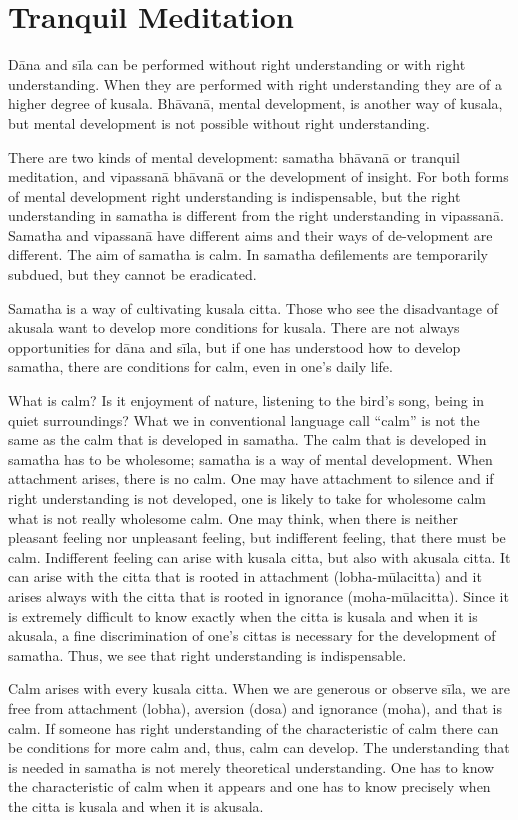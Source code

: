 \section*{Tranquil Meditation}

Dāna and sīla can be performed without right understanding or with right
understanding. When they are performed with right understanding they are
of a higher degree of kusala. Bhāvanā, mental development, is another
way of kusala, but mental development is not possible without right
understanding.

There are two kinds of mental development: samatha bhāvanā or tranquil
meditation, and vipassanā bhāvanā or the development of insight. For
both forms of mental development right understanding is indispensable,
but the right understanding in samatha is different from the right
understanding in vipassanā. Samatha and vipassanā have different aims
and their ways of de-velopment are different. The aim of samatha is
calm. In samatha defilements are temporarily subdued, but they cannot be
eradicated.

Samatha is a way of cultivating kusala citta. Those who see the
disadvantage of akusala want to develop more conditions for kusala.
There are not always opportunities for dāna and sīla, but if one has
understood how to develop samatha, there are conditions for calm, even
in one's daily life.

What is calm? Is it enjoyment of nature, listening to the bird's song,
being in quiet surroundings? What we in conventional language call
``calm'' is not the same as the calm that is developed in samatha. The
calm that is developed in samatha has to be wholesome; samatha is a way
of mental development. When attachment arises, there is no calm. One may
have attachment to silence and if right understanding is not developed,
one is likely to take for wholesome calm what is not really wholesome
calm. One may think, when there is neither pleasant feeling nor
unpleasant feeling, but indifferent feeling, that there must be calm.
Indifferent feeling can arise with kusala citta, but also with akusala
citta. It can arise with the citta that is rooted in attachment
(lobha-mūlacitta) and it arises always with the citta that is rooted in
ignorance (moha-mūlacitta). Since it is extremely difficult to know
exactly when the citta is kusala and when it is akusala, a fine
discrimination of one's cittas is necessary for the development of
samatha. Thus, we see that right understanding is indispensable.

Calm arises with every kusala citta. When we are generous or observe
sīla, we are free from attachment (lobha), aversion (dosa) and ignorance
(moha), and that is calm. If someone has right understanding of the
characteristic of calm there can be conditions for more calm and, thus,
calm can develop. The understanding that is needed in samatha is not
merely theoretical understanding. One has to know the characteristic of
calm when it appears and one has to know precisely when the citta is
kusala and when it is akusala.

